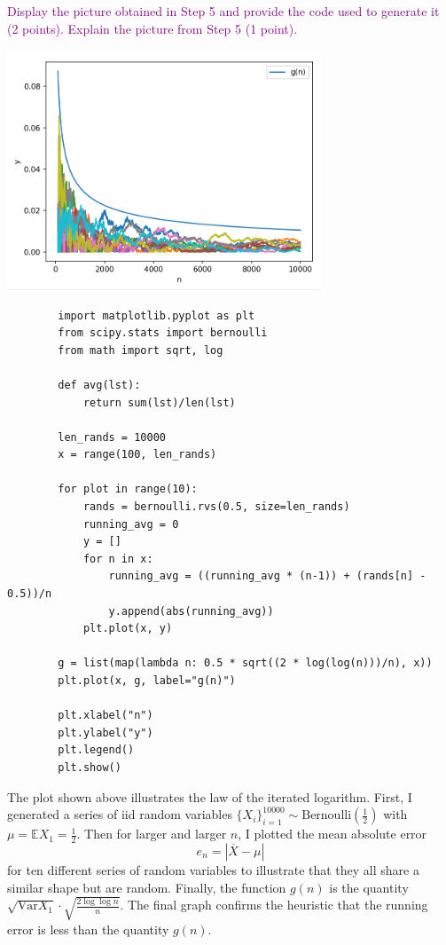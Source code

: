 \documentclass[11pt,letterpaper, leqno]{article}
\numberwithin{equation}{section}
\numberwithin{theorem}{section}
\numberwithin{lemma}{section}
\numberwithin{corollary}{section}
\numberwithin{definition}{section}
\numberwithin{proposition}{section}
\numberwithin{remark}{section}
\numberwithin{example}{section}
\newcommand{\Var}{{\rm Var}}            %
\renewcommand{\Var}{\text{Var}}
\newcommand{\E}{\mathbb{E}}
\begin{document}
\textcolor{purple}{Display the picture obtained in Step 5 and provide the code used to generate it (2 points). Explain the picture from Step 5 (1 point).}

\includegraphics*[width=0.7\textwidth]{Images/q2.png}
\color{blue}
    \begin{verbatim}
        import matplotlib.pyplot as plt
        from scipy.stats import bernoulli
        from math import sqrt, log

        def avg(lst):
            return sum(lst)/len(lst)

        len_rands = 10000
        x = range(100, len_rands)

        for plot in range(10):
            rands = bernoulli.rvs(0.5, size=len_rands)
            running_avg = 0
            y = []
            for n in x:
                running_avg = ((running_avg * (n-1)) + (rands[n] - 0.5))/n
                y.append(abs(running_avg))
            plt.plot(x, y)

        g = list(map(lambda n: 0.5 * sqrt((2 * log(log(n)))/n), x))
        plt.plot(x, g, label="g(n)")

        plt.xlabel("n")
        plt.ylabel("y")
        plt.legend()
        plt.show()
    \end{verbatim}

    The plot shown above illustrates the law of the iterated logarithm. First, I generated a series of iid random variables $\{X_i\}_{i = 1}^{10000} \sim \text{Bernoulli}\left(\frac{1}{2}\right)$ with $\mu = \E X_1 = \frac{1}{2}$. Then for larger and larger $n$, I plotted the mean absolute error 
    \[e_n = |\overline X - \mu|\]
    for ten different series of random variables to illustrate that they all share a similar shape but are random. Finally, the function $g(n)$ is the quantity $\sqrt{\Var X_1} \cdot \sqrt{\frac{2\log\log n}{n}}$. The final graph confirms the heuristic that the running error is less than the quantity $g(n)$.
\color{black}
\pagebreak
\end{document}
